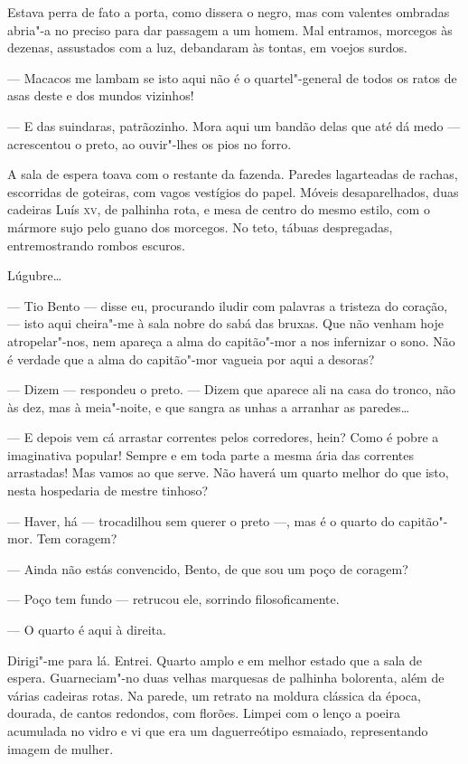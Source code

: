 Estava perra de fato a porta, como dissera o negro, mas com valentes
ombradas abria"-a no preciso para dar passagem a um homem. Mal entramos,
morcegos às dezenas, assustados com a luz, debandaram às tontas, em
voejos surdos.

--- Macacos me lambam se isto aqui não é o quartel"-general de todos os
ratos de asas deste e dos mundos vizinhos!

--- E das suindaras, patrãozinho. Mora aqui um bandão delas que até dá
medo --- acrescentou o preto, ao ouvir"-lhes os pios no forro.

A sala de espera toava com o restante da fazenda. Paredes lagarteadas de
rachas, escorridas de goteiras, com vagos vestígios do papel. Móveis
desaparelhados, duas cadeiras Luís \textsc{xv}, de palhinha rota, e mesa de
centro do mesmo estilo, com o mármore sujo pelo guano dos morcegos. No
teto, tábuas despregadas, entremostrando rombos escuros.

Lúgubre\ldots{}

--- Tio Bento --- disse eu, procurando iludir com palavras a tristeza do
coração, --- isto aqui cheira"-me à sala nobre do sabá das bruxas. Que
não venham hoje atropelar"-nos, nem apareça a alma do capitão"-mor a nos
infernizar o sono. Não é verdade que a alma do capitão"-mor vagueia por
aqui a desoras?

--- Dizem --- respondeu o preto. --- Dizem que aparece ali na casa do
tronco, não às dez, mas à meia"-noite, e que sangra as unhas a arranhar
as paredes\ldots{}

--- E depois vem cá arrastar correntes pelos corredores, hein? Como é
pobre a imaginativa popular! Sempre e em toda parte a mesma ária das
correntes arrastadas! Mas vamos ao que serve. Não haverá um quarto
melhor do que isto, nesta hospedaria de mestre tinhoso?

--- Haver, há --- trocadilhou sem querer o preto ---, mas é o quarto do
capitão"-mor. Tem coragem?

--- Ainda não estás convencido, Bento, de que sou um poço de coragem?

--- Poço tem fundo --- retrucou ele, sorrindo filosoficamente.

--- O quarto é aqui à direita.

Dirigi"-me para lá. Entrei. Quarto amplo e em melhor estado que a sala de
espera. Guarneciam"-no duas velhas marquesas de palhinha bolorenta, além
de várias cadeiras rotas. Na parede, um retrato na moldura clássica da
época, dourada, de cantos redondos, com florões. Limpei com o lenço a
poeira acumulada no vidro e vi que era um daguerreótipo esmaiado,
representando imagem de mulher.

